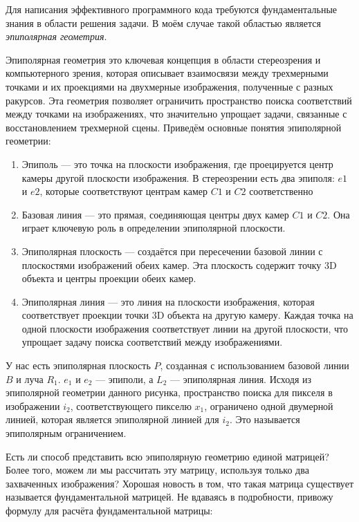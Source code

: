 Для написания эффективного программного кода требуются фундаментальные знания в области решения задачи. В моём случае такой областью является \textit{эпиполярная геометрия}.

Эпиполярная геометрия это ключевая концепция в области стереозрения и компьютерного зрения, которая описывает взаимосвязи между трехмерными точками и их проекциями на двухмерные изображения, полученные с разных ракурсов. Эта геометрия позволяет ограничить пространство поиска соответствий между точками на изображениях, что значительно упрощает задачи, связанные с восстановлением трехмерной сцены. Приведём основные понятия эпиполярной геометрии:
\begin{enumerate}
    \item Эпиполь — это точка на плоскости изображения, где проецируется центр камеры другой плоскости изображения. В стереозрении есть два эпиполя: $e1$ и $e2$, которые соответствуют центрам камер $C1$ и $C2$ соответственно

    \item Базовая линия — это прямая, соединяющая центры двух камер $C1$ и $C2$. Она играет ключевую роль в определении эпиполярной плоскости.

    \item Эпиполярная плоскость — создаётся при пересечении базовой линии с плоскостями изображений обеих камер. Эта плоскость содержит точку 3D объекта и центры проекции обеих камер.

    \item Эпиполярная линия — это линия на плоскости изображения, которая соответствует проекции точки 3D объекта на другую камеру. Каждая точка на одной плоскости изображения соответствует линии на другой плоскости, что упрощает задачу поиска соответствий между изображениями.
\end{enumerate}


У нас есть эпиполярная плоскость $P$, созданная с использованием базовой линии $B$ и луча $R_1$. $e_1$ и $e_2$ — эпиполи, а $L_2$ — эпиполярная линия. Исходя из эпиполярной геометрии данного рисунка, пространство поиска для пикселя в изображении $i_2$, соответствующего пикселю $x_1$, ограничено одной двумерной линией, которая является эпиполярной линией для $i_2$. Это называется эпиполярным ограничением.

Есть ли способ представить всю эпиполярную геометрию единой матрицей? Более того, можем ли мы рассчитать эту матрицу, используя только два захваченных изображения? Хорошая новость в том, что такая матрица существует называется фундаментальной матрицей. Не вдаваясь в подробности, привожу формулу для расчёта фундаментальной матрицы:

